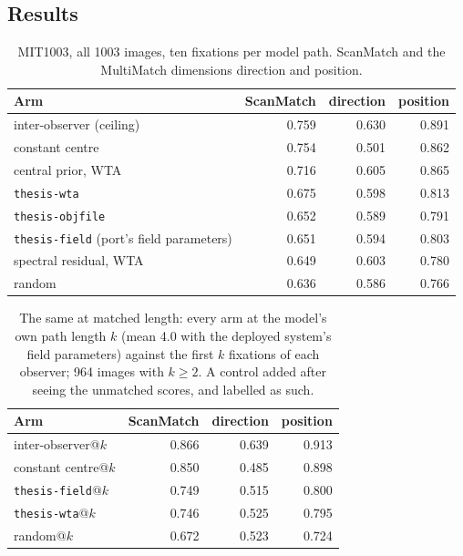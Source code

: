 \documentclass[11pt,a4paper]{article}
\newcommand{\arm}[1]{\texttt{#1}}
\begin{document}
\subsection{Results}
\begin{table}[t]
\caption{MIT1003, all 1003 images, ten fixations per model path. ScanMatch and
the MultiMatch dimensions direction and position.}
\label{tab:h4}
\small
\begin{tabular}{@{}lrrr@{}}
\toprule
Arm & ScanMatch & direction & position \\
\midrule
inter-observer (ceiling) & 0.759 & 0.630 & 0.891 \\
constant centre          & 0.754 & 0.501 & 0.862 \\
central prior, WTA       & 0.716 & 0.605 & 0.865 \\
\arm{thesis-wta}         & 0.675 & 0.598 & 0.813 \\
\arm{thesis-objfile}     & 0.652 & 0.589 & 0.791 \\
\arm{thesis-field} (port's field parameters) & 0.651 & 0.594 & 0.803 \\
spectral residual, WTA   & 0.649 & 0.603 & 0.780 \\
random                   & 0.636 & 0.586 & 0.766 \\
\bottomrule
\end{tabular}
\end{table}

\begin{table}[t]
\caption{The same at matched length: every arm at the model's own path length
$k$ (mean 4.0 with the deployed system's field parameters) against the first $k$
fixations of each observer; 964 images with $k\ge2$. A control added after
seeing the unmatched scores, and labelled as such.}
\label{tab:h4k}
\small
\begin{tabular}{@{}lrrr@{}}
\toprule
Arm & ScanMatch & direction & position \\
\midrule
inter-observer@$k$ & 0.866 & 0.639 & 0.913 \\
constant centre@$k$ & 0.850 & 0.485 & 0.898 \\
\arm{thesis-field}@$k$ & 0.749 & 0.515 & 0.800 \\
\arm{thesis-wta}@$k$ & 0.746 & 0.525 & 0.795 \\
random@$k$ & 0.672 & 0.523 & 0.724 \\
\bottomrule
\end{tabular}
\end{table}
\end{document}
